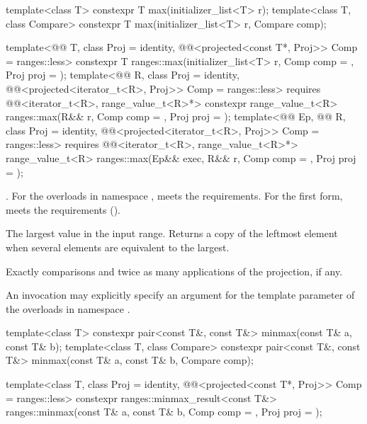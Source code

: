 %
\begin{itemdecl}
template<class T>
  constexpr T max(initializer_list<T> r);
template<class T, class Compare>
  constexpr T max(initializer_list<T> r, Compare comp);

template<@@ T, class Proj = identity,
         @@<projected<const T*, Proj>> Comp = ranges::less>
  constexpr T ranges::max(initializer_list<T> r, Comp comp = {}, Proj proj = {});
template<@@ R, class Proj = identity,
         @@<projected<iterator_t<R>, Proj>> Comp = ranges::less>
  requires @@<iterator_t<R>, range_value_t<R>*>
  constexpr range_value_t<R>
    ranges::max(R&& r, Comp comp = {}, Proj proj = {});
template<@@ Ep, @@ R, class Proj = identity,
         @@<projected<iterator_t<R>, Proj>> Comp = ranges::less>
  requires @@<iterator_t<R>, range_value_t<R>*>
  range_value_t<R>
    ranges::max(Ep&& exec, R&& r, Comp comp = {}, Proj proj = {});
\end{itemdecl}

\begin{itemdescr}
\pnum
\expects
{}.
For the overloads in namespace ,
 meets the  requirements.
For the first form,  meets the 
requirements ().

\pnum
\returns
The largest value in the input range.
Returns a copy of the leftmost element
when several elements are equivalent to the largest.

\pnum
\complexity
Exactly  comparisons
and twice as many applications of the projection, if any.

\pnum
\remarks
An invocation may explicitly specify
an argument for the template parameter 
of the overloads in namespace .
\end{itemdescr}

%
\begin{itemdecl}
template<class T>
  constexpr pair<const T&, const T&> minmax(const T& a, const T& b);
template<class T, class Compare>
  constexpr pair<const T&, const T&> minmax(const T& a, const T& b, Compare comp);

template<class T, class Proj = identity,
         @@<projected<const T*, Proj>> Comp = ranges::less>
  constexpr ranges::minmax_result<const T&>
    ranges::minmax(const T& a, const T& b, Comp comp = {}, Proj proj = {});
\end{itemdecl}



